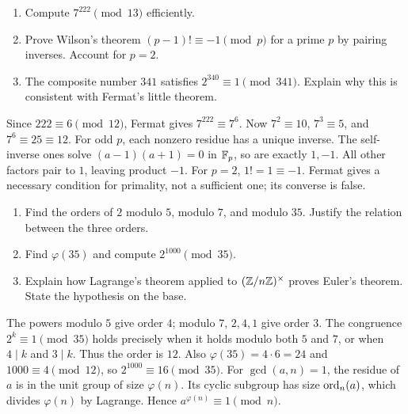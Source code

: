 \begin{enumerate}
\item Compute $7^{222}\pmod{13}$ efficiently. 
\item Prove Wilson's theorem $(p-1)!\equiv-1\pmod p$ for a prime $p$
by pairing inverses. Account for $p=2$. 
\item The composite number $341$ satisfies $2^{340}\equiv1\pmod{341}$.
Explain why this is consistent with Fermat's little theorem. 
\end{enumerate}
\begin{solution}
Since $222\equiv6\pmod{12}$, Fermat gives $7^{222}\equiv7^6$.
Now $7^2\equiv10$, $7^3\equiv5$, and $7^6\equiv25\equiv12$.
For odd $p$, each nonzero residue has a unique inverse. The self-inverse
ones solve $(a-1)(a+1)=0$ in $\mathbb F_p$, so are exactly $1,-1$.
All other factors pair to $1$, leaving product $-1$.
For $p=2$, $1!=1\equiv-1$. Fermat gives a necessary condition for
primality, not a sufficient one; its converse is false.
\end{solution}

\begin{enumerate}
\item Find the orders of $2$ modulo $5$, modulo $7$, and modulo $35$.
Justify the relation between the three orders. 
\item Find $\varphi(35)$ and compute $2^{1000}\pmod{35}$. 
\item Explain how Lagrange's theorem applied to $(\mathbb Z/n\mathbb Z)^\times$
proves Euler's theorem. State the hypothesis on the base. 
\end{enumerate}
\begin{solution}
The powers modulo $5$ give order $4$; modulo $7$, $2,4,1$ give order $3$.
The congruence $2^k\equiv1\pmod{35}$ holds precisely when it holds
modulo both $5$ and $7$, or when $4\mid k$ and $3\mid k$.
Thus the order is $12$. Also $\varphi(35)=4\cdot6=24$ and
$1000\equiv4\pmod{12}$, so $2^{1000}\equiv16\pmod{35}$.
For $\gcd(a,n)=1$, the residue of $a$ is in the unit group of size
$\varphi(n)$. Its cyclic subgroup has size $\operatorname{ord}_n(a)$, which divides
$\varphi(n)$ by Lagrange. Hence $a^{\varphi(n)}\equiv1\pmod n$.
\end{solution}

